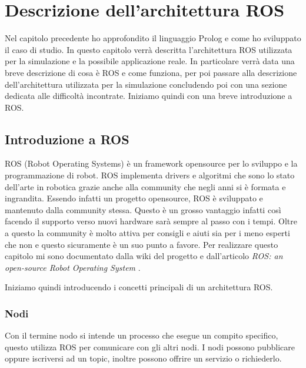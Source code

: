 \chapter{Descrizione dell'architettura ROS}
\label{cha:descrizionearchros}
Nel capitolo precedente ho approfondito il linguaggio Prolog e come ho sviluppato il caso di studio. In questo capitolo verrà descritta l'architettura ROS utilizzata per la simulazione e la possibile applicazione reale.
In particolare verrà data una breve descrizione di cosa è ROS e come funziona, per poi passare alla descrizione dell'architettura utilizzata per la simulazione concludendo poi con una sezione dedicata alle difficoltà incontrate. Iniziamo quindi con una breve introduzione a ROS.

\section{Introduzione a ROS}
\label{sec:introduzione_ros}
ROS (Robot Operating Systems) è un framework opensource per lo sviluppo e la programmazione di robot. ROS implementa drivers e algoritmi che sono lo stato dell'arte in robotica grazie anche alla community che negli anni si è formata e ingrandita.
Essendo infatti un progetto opensource, ROS è sviluppato e mantenuto dalla community stessa. Questo è un grosso vantaggio infatti così facendo il supporto verso nuovi hardware sarà sempre al passo con i tempi. Oltre a questo la community è molto attiva per consigli e aiuti sia per i meno esperti che non e questo sicuramente è un suo punto a favore.
Per realizzare questo capitolo mi sono documentato dalla wiki del progetto \cite{rossite} e dall'articolo \textit{ROS: an open-source Robot Operating System} \cite{quingley2009ros}.

Iniziamo quindi introducendo i concetti principali di un architettura ROS.

\subsection{Nodi}
\label{subsec:nodi}
Con il termine nodo si intende un processo che esegue un compito specifico, questo utilizza ROS per comunicare con gli altri nodi. I nodi possono pubblicare oppure iscriversi ad un topic, inoltre possono offrire un servizio o richiederlo. 

